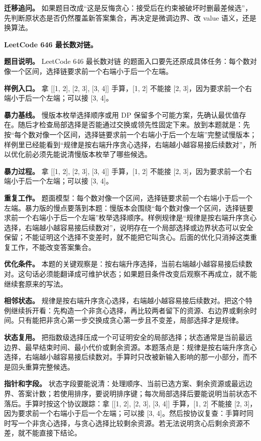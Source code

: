 \textbf{迁移追问。} 如果题目改成“这是反悔贪心：接受后在约束被破坏时删最差候选”，先判断原状态是否仍然覆盖新答案集合，再决定是微调边界、改 value 语义，还是换算法。

\noindent\textbf{LeetCode 646 最长数对链。}

\textbf{题目说明。} LeetCode 646 最长数对链 的题面入口要先还原成具体任务：每个数对像一个区间，选择链要求前一个右端小于后一个左端。

\textbf{样例入口。} 拿 [[1, 2], [2, 3], [3, 4]] 手算，[1, 2] 不能接 [2, 3]，因为要求前一个右端小于后一个左端；可以接 [3, 4]。

\textbf{暴力基线。} 慢版本枚举选择顺序或用 DP 保留多个可能方案，先确认最优值存在。随后才检查局部选择是否能通过交换或领先性固定下来。放到本题就是：先按“每个数对像一个区间，选择链要求前一个右端小于后一个左端”完整试慢版本；样例里已经能看到“规律是按右端升序贪心选择，右端越小越容易接后续数对”，所以优化前必须先能说清慢版本枚举了哪些候选。

\textbf{暴力过程。} 拿 [[1, 2], [2, 3], [3, 4]] 手算，[1, 2] 不能接 [2, 3]，因为要求前一个右端小于后一个左端；可以接 [3, 4]。

\textbf{重复工作。} 题面模型：每个数对像一个区间，选择链要求前一个右端小于后一个左端。暴力版的慢点要落到本题：慢版本会围绕“每个数对像一个区间，选择链要求前一个右端小于后一个左端”枚举选择顺序。样例规律是“规律是按右端升序贪心选择，右端越小越容易接后续数对”，说明存在一个局部选择或边界状态可以安全保留；不能证明这个选择不变差时，就不能把它叫贪心。后面的优化只消掉这类重复工作，不能改变答案集合。

\textbf{优化条件。} 本题的关键观察是：按右端升序选择，当前右端越小越容易接后续数对。这句话必须能翻译成可维护状态；如果题目条件改变后观察不再成立，就不能继续套原来的写法。

\textbf{相邻状态。} 规律是按右端升序贪心选择，右端越小越容易接后续数对。把这个特例继续拆开看：先构造一个非贪心选择，再比较两者留下的资源、右边界或剩余时间。只有能把非贪心第一步交换成贪心第一步且不变差，局部选择才是规律。

\textbf{状态复用。} 把指数级选择压成一个可证明安全的局部选择；状态通常是当前最远边界、最早结束时间、最小代价或剩余资源。本题落点是：规律是按右端升序贪心选择，右端越小越容易接后续数对。手算时只改被新输入影响的那一小部分，而不是回头重算完整候选。

\textbf{指针和字段。} 状态字段要能说清：处理顺序、当前已选方案、剩余资源或最远边界、答案计数；若使用排序，要说明排序键；每次局部选择后要能说明当前状态不落后。手算时按这个协议跟踪：拿 [[1, 2], [2, 3], [3, 4]] 手算，[1, 2] 不能接 [2, 3]，因为要求前一个右端小于后一个左端；可以接 [3, 4]。然后按协议复查：手算时同时写一个非贪心选择，与贪心选择比较剩余资源。若无法说明贪心后剩余资源不差，就不能直接下结论。

